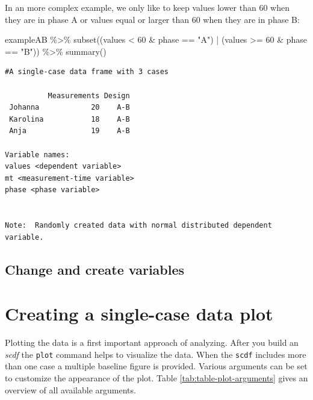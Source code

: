 \documentclass[
]{book}
\newenvironment{Shaded}{\begin{snugshade}}{\end{snugshade}}
\newcommand{\DecValTok}[1]{\textcolor[rgb]{0.00,0.00,0.81}{#1}}
\newcommand{\FunctionTok}[1]{\textcolor[rgb]{0.00,0.00,0.00}{#1}}
\newcommand{\NormalTok}[1]{#1}
\newcommand{\SpecialCharTok}[1]{\textcolor[rgb]{0.00,0.00,0.00}{#1}}
\newcommand{\StringTok}[1]{\textcolor[rgb]{0.31,0.60,0.02}{#1}}
\begin{document}
In an more complex example, we only like to keep values lower than 60 when they are in phase A or values equal or larger than 60 when they are in phase B:

\begin{Shaded}
\begin{Highlighting}[]
\NormalTok{exampleAB }\SpecialCharTok{\%\textgreater{}\%}
  \FunctionTok{subset}\NormalTok{((values }\SpecialCharTok{\textless{}} \DecValTok{60} \SpecialCharTok{\&}\NormalTok{ phase }\SpecialCharTok{==} \StringTok{"A"}\NormalTok{) }\SpecialCharTok{|}\NormalTok{ (values }\SpecialCharTok{\textgreater{}=} \DecValTok{60} \SpecialCharTok{\&}\NormalTok{ phase }\SpecialCharTok{==} \StringTok{"B"}\NormalTok{)) }\SpecialCharTok{\%\textgreater{}\%}
  \FunctionTok{summary}\NormalTok{()}
\end{Highlighting}
\end{Shaded}

\begin{verbatim}
#A single-case data frame with 3 cases

          Measurements Design
 Johanna            20    A-B
 Karolina           18    A-B
 Anja               19    A-B

Variable names:
values <dependent variable>
mt <measurement-time variable>
phase <phase variable>


Note:  Randomly created data with normal distributed dependent variable.
\end{verbatim}

\hypertarget{change-and-create-variables}{%
\section{Change and create variables}\label{change-and-create-variables}}

\hypertarget{creating-a-single-case-data-plot}{%
\chapter{Creating a single-case data plot}\label{creating-a-single-case-data-plot}}

Plotting the data is a first important approach of analyzing. After you build an \emph{scdf} the \texttt{plot} command helps to visualize the data. When the \texttt{scdf} includes more than one case a multiple baseline figure is provided. Various arguments can be set to customize the appearance of the plot. Table \ref{tab:table-plot-arguments} gives an overview of all available arguments.
\end{document}
